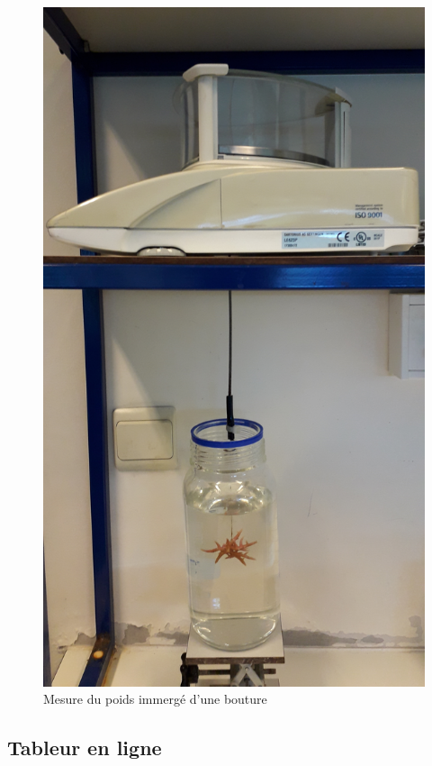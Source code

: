 \documentclass[]{report}
\begin{document}
\begin{figure}[h!]
\includegraphics[]{../image/poster-balance.jpg}
\caption{Mesure du poids immergé d'une bouture}
\end{figure}

\null
\newpage

\subsection{Tableur en ligne}\label{tableur-en-ligne}
\end{document}
